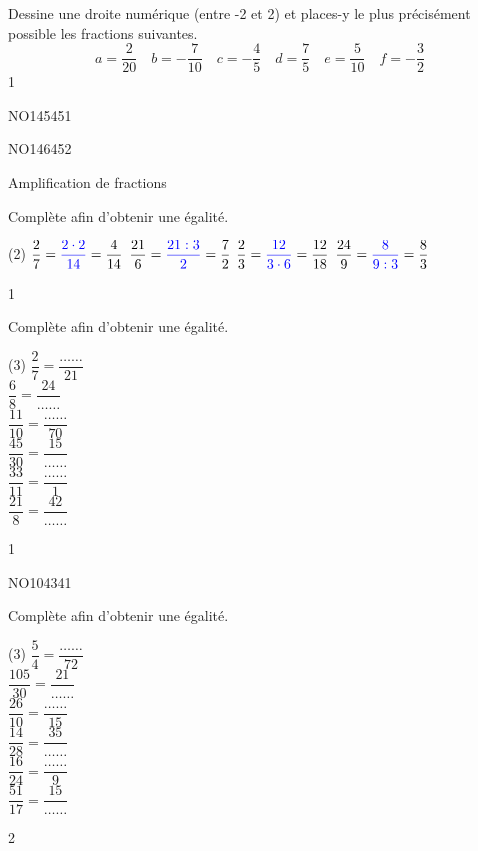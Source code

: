 \documentclass[a4paper,11pt]{report}
\begin{document}
\begin{exo}{
Dessine une droite numérique (entre -2 et 2) et places-y le plus précisément possible les fractions suivantes.
\[
a=\dfrac{2}{20} \quad b=-\dfrac{7}{10} \quad c=-\dfrac{4}{5} \quad d=\dfrac{7}{5} \quad e=\dfrac{5}{10} \quad f=-\dfrac{3}{2}
\]}
{1}\end{exo}


\begin{exof}{NO145}{45}{1}
\end{exof}
\begin{exof}{NO146}{45}{2}
\end{exof}




\begin{resolu}{Amplification de fractions}
{Complète afin d'obtenir une égalité.

\begin{tasks}(2)
  \task $\dfrac{2}{7}={\color{blue}\dfrac{2\cdot2}{14}}=\dfrac{4}{14}$
  \task $\dfrac{21}{6}={\color{blue}\dfrac{21\div3}{2}}=\dfrac{7}{2}$
     \task $\dfrac{2}{3}={\color{blue}\dfrac{12}{3\cdot6}}=\dfrac{12}{18}$
      \task $\dfrac{24}{9}={\color{blue}\dfrac{8}{9\div3}}=\dfrac{8}{3}$
\end{tasks}
 \vspace{1pt}
}{1}
\end{resolu}
\begin{exop}{
Complète afin d'obtenir une égalité.
\begin{tasks}[after-item-skip = 0.2em, after-skip=-1em](3)
    \task $\dfrac{2}{7}=\dfrac{\ldots\ldots}{21}$\\
    \task $\dfrac{6}{8}=\dfrac{24}{\ldots\ldots}$\\
    \task $\dfrac{11}{10}=\dfrac{\ldots\ldots}{70}$\\
    \task $\dfrac{45}{30}=\dfrac{15}{\ldots\ldots}$\\
    \task $\dfrac{33}{11}=\dfrac{\ldots\ldots}{1}$\\
    \task $\dfrac{21}{8}=\dfrac{42}{\ldots\ldots}$\\
\end{tasks}
}{1}\end{exop}


\begin{exof}{NO104}{34}{1}
\end{exof}

\begin{exop}{
Complète afin d'obtenir une égalité.
\begin{tasks}[after-item-skip = 0.2em, after-skip=-1em](3)
    \task $\dfrac{5}{4}=\dfrac{\ldots\ldots}{72}$\\
    \task $\dfrac{105}{30}=\dfrac{21}{\ldots\ldots}$\\
    \task $\dfrac{26}{10}=\dfrac{\ldots\ldots}{15}$\\
    \task $\dfrac{14}{28}=\dfrac{35}{\ldots\ldots}$\\
    \task $\dfrac{16}{24}=\dfrac{\ldots\ldots}{9}$\\
    \task $\dfrac{51}{17}=\dfrac{15}{\ldots\ldots}$\\
\end{tasks}
}{2}\end{exop}
\end{document}
